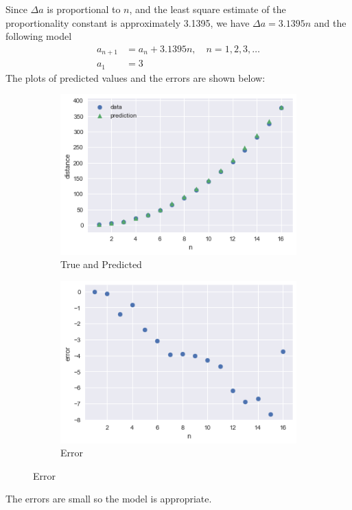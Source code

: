 \documentclass[10pt]{report}
\begin{document}
\begin{enumerate}
\begin{enumerate}
		Since $\Delta a$ is proportional to $n$, and the least square estimate of the proportionality constant is approximately 3.1395, we have $\Delta a = 3.1395 n$ and the following model
		\begin{align*}
			a_{n+1} &= a_n + 3.1395 n, \quad n=1,2,3,\dots\\
			a_1 &= 3
		\end{align*}
		The plots of predicted values and the errors are shown below:
		\begin{figure}[H]
			\centering
			\begin{subfigure}[b]{.4\linewidth}
				\caption{True and Predicted}
				\includegraphics[width=\linewidth]{s1_2/9-data-pred.png}
			\end{subfigure}
			\begin{subfigure}[b]{.4\linewidth}
				\caption{Error}
				\includegraphics[width=\linewidth]{s1_2/9-error.png}
			\end{subfigure}
		\end{figure}
		The errors are small so the model is appropriate.
	\end{enumerate}
\end{enumerate}
\end{document}
